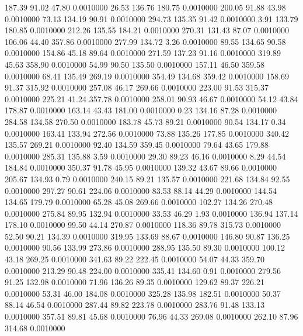  187.39   91.02   47.80   0.0010000
  26.53  136.76  180.75   0.0010000
 200.05   91.88   43.98   0.0010000
  73.13  134.19   90.91   0.0010000
 294.73  135.35   91.42   0.0010000
   3.91  133.79  180.85   0.0010000
 212.26  135.55  184.21   0.0010000
 270.31  131.43   87.07   0.0010000
 106.06   44.40  357.86   0.0010000
 277.99  134.72    3.26   0.0010000
  89.55  134.65   90.58   0.0010000
 154.86   45.18   89.64   0.0010000
 271.59  137.23   91.16   0.0010000
 319.89   45.63  358.90   0.0010000
  54.99   90.50  135.50   0.0010000
 157.11   46.50  359.58   0.0010000
  68.41  135.49  269.19   0.0010000
 354.49  134.68  359.42   0.0010000
 158.69   91.37  315.92   0.0010000
 257.08   46.17  269.66   0.0010000
 223.00   91.53  315.37   0.0010000
 225.21   41.24  357.78   0.0010000
 258.01   90.93   46.67   0.0010000
  54.12   43.84  178.87   0.0010000
 163.14   43.43  181.00   0.0010000
   0.23  134.16   87.28   0.0010000
 284.58  134.58  270.50   0.0010000
 183.78   45.73   89.21   0.0010000
  90.54  134.17    0.34   0.0010000
 163.41  133.94  272.56   0.0010000
  73.88  135.26  177.85   0.0010000
 340.42  135.57  269.21   0.0010000
  92.40  134.59  359.45   0.0010000
  79.64   43.65  179.88   0.0010000
 285.31  135.88    3.59   0.0010000
  29.30   89.23   46.16   0.0010000
   8.29   44.54  184.84   0.0010000
 350.37   91.78   45.95   0.0010000
 139.32   43.67   89.66   0.0010000
 205.67  134.93    0.79   0.0010000
 240.15   89.21  135.57   0.0010000
 221.68  134.84   92.55   0.0010000
 297.27   90.61  224.06   0.0010000
  83.53   88.14   44.29   0.0010000
 144.54  134.65  179.79   0.0010000
  65.28   45.08  269.66   0.0010000
 102.27  134.26  270.48   0.0010000
 275.84   89.95  132.94   0.0010000
  33.53   46.29    1.93   0.0010000
 136.94  137.14  178.10   0.0010000
  99.50   44.14  270.87   0.0010000
 118.36   89.78  315.73   0.0010000
  52.50   90.21  134.39   0.0010000
 319.95  133.69   88.67   0.0010000
 146.80   90.87  136.25   0.0010000
  90.56  133.99  273.86   0.0010000
 288.95  135.50   89.30   0.0010000
 100.12   43.18  269.25   0.0010000
 341.63   89.22  222.45   0.0010000
  54.07   44.33  359.70   0.0010000
 213.29   90.48  224.00   0.0010000
 335.41  134.60    0.91   0.0010000
 279.56   91.25  132.98   0.0010000
  71.96  136.26   89.35   0.0010000
 129.62   89.37  226.21   0.0010000
  53.31   46.00  184.08   0.0010000
 325.28  135.98  182.51   0.0010000
  50.37   88.14   46.54   0.0010000
 287.44   89.82  223.78   0.0010000
 283.76   91.48  133.13   0.0010000
 357.51   89.81   45.68   0.0010000
  76.96   44.33  269.08   0.0010000
 262.10   87.96  314.68   0.0010000

